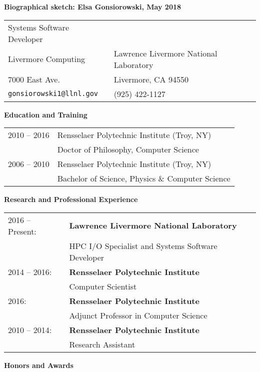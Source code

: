 \documentclass[times,11pt]{article}    %
\begin{document}
\begin{center}
\textbf{\sffamily\large Biographical sketch: Elsa Gonsiorowski, May 2018}
\end{center}

\vskip 3pt
\begin{tabular}{ll}
\\
Systems Software Developer &\\
Livermore Computing & Lawrence Livermore National Laboratory\\
7000 East Ave. & Livermore, CA 94550\\
\texttt{gonsiorowski1@llnl.gov} & (925) 422-1127
\end{tabular}
\vskip 6pt

\vskip 3pt
\textbf{\sffamily Education and Training}
\vskip 3pt

\begin{tabular}{ll}
\\
2010 -- 2016 & Rensselaer Polytechnic Institute (Troy, NY)\\
             & Doctor of Philosophy, Computer Science\\
2006 -- 2010 & Rensselaer Polytechnic Institute (Troy, NY)\\
             & Bachelor of Science, Physics \& Computer Science\\
\end{tabular}

\vskip 6pt
\textbf{\sffamily Research and Professional Experience}
\vskip 3pt

\begin{tabular}{ll}
2016 -- Present: &
\textbf{Lawrence Livermore National Laboratory}\\
 & HPC I/O Specialist and Systems Software Developer \\

2014 -- 2016: &
\textbf{Rensselaer Polytechnic Institute}\\
 & Computer Scientist \\

2016: &
\textbf{Rensselaer Polytechnic Institute}\\
 & Adjunct Professor in Computer Science \\

2010 -- 2014: &
\textbf{Rensselaer Polytechnic Institute}\\
 & Research Assistant \\
\end{tabular}

\vskip 6pt
\textbf{\sffamily Honors and Awards}
\vskip 3pt
\end{document}
